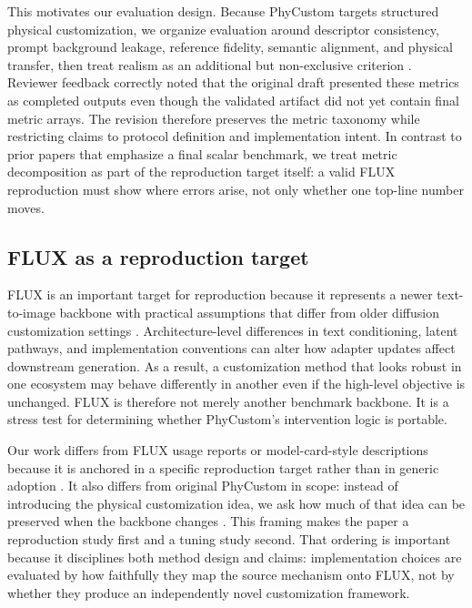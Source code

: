 \documentclass{article}
\begin{document}
This motivates our evaluation design. Because PhyCustom targets structured physical customization, we organize evaluation around descriptor consistency, prompt background leakage, reference fidelity, semantic alignment, and physical transfer, then treat realism as an additional but non-exclusive criterion \cite{wu2025phycustom}. Reviewer feedback correctly noted that the original draft presented these metrics as completed outputs even though the validated artifact did not yet contain final metric arrays. The revision therefore preserves the metric taxonomy while restricting claims to protocol definition and implementation intent. In contrast to prior papers that emphasize a final scalar benchmark, we treat metric decomposition as part of the reproduction target itself: a valid FLUX reproduction must show where errors arise, not only whether one top-line number moves.

\subsection{FLUX as a reproduction target}

FLUX is an important target for reproduction because it represents a newer text-to-image backbone with practical assumptions that differ from older diffusion customization settings \cite{blackforestlabs2024fluxdev}. Architecture-level differences in text conditioning, latent pathways, and implementation conventions can alter how adapter updates affect downstream generation. As a result, a customization method that looks robust in one ecosystem may behave differently in another even if the high-level objective is unchanged. FLUX is therefore not merely another benchmark backbone. It is a stress test for determining whether PhyCustom's intervention logic is portable.

Our work differs from FLUX usage reports or model-card-style descriptions because it is anchored in a specific reproduction target rather than in generic adoption \cite{blackforestlabs2024fluxdev}. It also differs from original PhyCustom in scope: instead of introducing the physical customization idea, we ask how much of that idea can be preserved when the backbone changes \cite{wu2025phycustom}. This framing makes the paper a reproduction study first and a tuning study second. That ordering is important because it disciplines both method design and claims: implementation choices are evaluated by how faithfully they map the source mechanism onto FLUX, not by whether they produce an independently novel customization framework.
\end{document}
